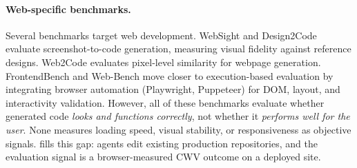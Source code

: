 \paragraph{Web-specific benchmarks.}
Several benchmarks target web development. WebSight \cite{bhathal2025websight} and Design2Code \cite{si2025design2code} evaluate screenshot-to-code generation, measuring visual fidelity against reference designs. Web2Code \cite{yun2024web2code} evaluates pixel-level similarity for webpage generation. FrontendBench \cite{zhu2025frontendbench} and Web-Bench \cite{xu2025web} move closer to execution-based evaluation by integrating browser automation (Playwright, Puppeteer) for DOM, layout, and interactivity validation. However, all of these benchmarks evaluate whether generated code \emph{looks and functions correctly}, not whether it \emph{performs well for the user}. None measures loading speed, visual stability, or responsiveness as objective signals. \OurBench fills this gap: agents edit existing production repositories, and the evaluation signal is a browser-measured CWV outcome on a deployed site.
